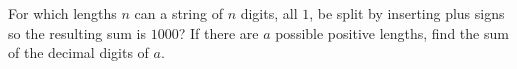 For which lengths $n$ can a string of $n$ digits, all $1$, be split by inserting plus signs so the resulting sum is $1000$? If there are $a$ possible positive lengths, find the sum of the decimal digits of $a$.
